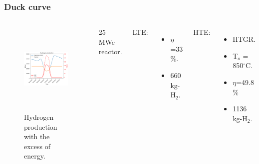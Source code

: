 \begin{frame}
\frametitle{Duck curve}
\begin{columns}
    \column[t]{5.5cm}
	\begin{figure}[htbp!]
		\begin{center}
			\includegraphics[height=4.4cm]{images/uiuc-hydro2}
		\end{center}
		\caption{Hydrogen production with the excess of energy.}
	\end{figure}

    \column[t]{4.5cm}
    25 MWe reactor. \vspace{0.7cm}

    LTE:
    \begin{itemize}
 		\item $\eta$=33$\%$.
 		\item 660 kg-H$_2$.
 	\end{itemize}
    \vspace{0.7cm}

    HTE:
    \begin{itemize}
 		\item HTGR.
 		\item T$_o$ = 850$^\circ$C.
 		\item $\eta$=49.8$\%$
 		\item 1136 kg-H$_2$.
 	\end{itemize}

\end{columns}
\end{frame}

